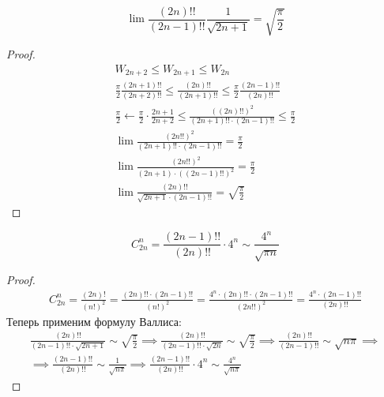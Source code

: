 \begin{theorem}
    \begin{equation*}
        \lim \frac{(2n)!!}{(2n - 1)!!}\frac{1}{\sqrt{2n + 1}} = \sqrt{\frac{\pi}{2}}
    \end{equation*}
\end{theorem}
\begin{proof}
  \begin{equation*}
    \begin{gathered}
      W_{2n + 2} \leq W_{2n + 1} \leq W_{2n} \\
      \frac{\pi}{2} \frac{(2n + 1)!!}{(2n + 2)!!} \leq \frac{(2n)!!}{(2n + 1)!!} \leq \frac{\pi}{2} \frac{(2n - 1)!!}{(2n)!!} \\
      \frac{\pi}{2} \leftarrow \frac{\pi}{2} \cdot \frac{2n + 1}{2n + 2} \leq \frac{((2n)!!)^2}{(2n + 1)!!\cdot(2n - 1)!!} \leq \frac{\pi}{2} \\
      \lim \frac{(2n!!)^2}{(2n + 1)!!\cdot(2n - 1)!!} = \frac{\pi}{2} \\
      \lim \frac{(2n!!)^2}{(2n + 1)\cdot((2n - 1)!!)^2} = \frac{\pi}{2} \\
      \lim \frac{(2n)!!}{\sqrt{2n + 1} \cdot (2n - 1)!!} = \sqrt{\frac{\pi}{2}}
    \end{gathered}
  \end{equation*}
\end{proof}

\begin{follow}
  \begin{equation*}
    C_{2n}^{n} = \frac{(2n - 1)!!}{(2n)!!} \cdot 4^n \sim \frac{4^n}{\sqrt{\pi n}}
  \end{equation*}
\end{follow}
\begin{proof}
  \begin{equation*}
    \begin{gathered}
      C_{2n}^{n} =
      \frac{(2n)!}{(n!)^2} =
      \frac{(2n)!! \cdot (2n - 1)!!}{(n!)^2} =
      \frac{4^n \cdot (2n)!! \cdot (2n - 1)!!}{(2n!!)^2} =
      \frac{4^n \cdot (2n - 1)!!}{(2n)!!}
    \end{gathered}
  \end{equation*}
  Теперь применим формулу Валлиса:
  \begin{equation*}
    \begin{gathered}
        \frac{(2n)!!}{(2n - 1)!! \cdot \sqrt{2n + 1}} \sim \sqrt{\frac{\pi}{2}}
        \implies
        \frac{(2n)!!}{(2n - 1)!! \cdot \sqrt{2n}} \sim \sqrt{\frac{\pi}{2}}
        \implies
        \frac{(2n)!!}{(2n - 1)!!} \sim \sqrt{n\pi}
        \implies \\
        \implies
        \frac{(2n - 1)!!}{(2n)!!} \sim \frac{1}{\sqrt{n\pi}}
        \implies
        \frac{(2n - 1)!!}{(2n)!!} \cdot 4^n \sim \frac{4^n}{\sqrt{n\pi}}
    \end{gathered}
  \end{equation*}
\end{proof}

